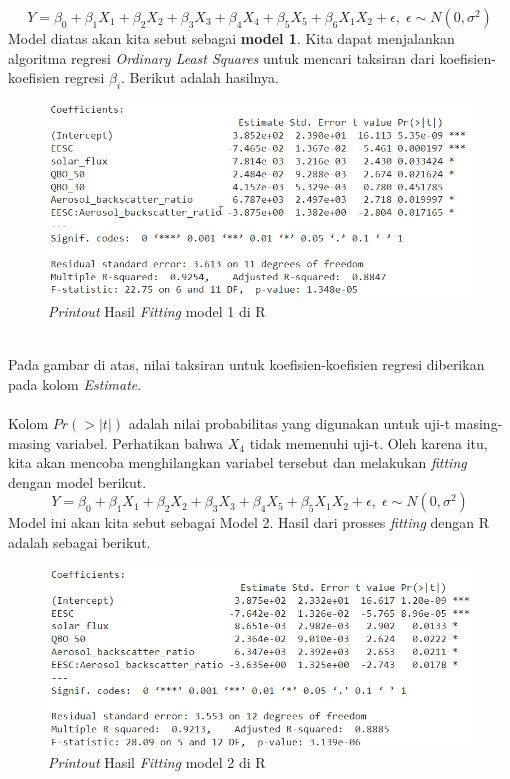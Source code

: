 \begin{enumerate}
\begin{equation*}
    Y = \beta_0 + \beta_1X_1 + \beta_2X_2 + \beta_3X_3 + \beta_4X_4 + \beta_5X_5 + \beta_6X_1X_2 +\epsilon,\;\epsilon \sim N(0, \sigma^2)
\end{equation*}
Model diatas akan kita sebut sebagai \textbf{model 1}. Kita dapat menjalankan algoritma regresi \textit{Ordinary Least Squares} untuk mencari taksiran dari koefisien-koefisien regresi $\beta_i$. Berikut adalah hasilnya.
\begin{figure}[h!]
    \centering
    \includegraphics[scale=0.7]{src/Pics/firstfitting.png}
    \caption{\textit{Printout} Hasil \textit{Fitting} model 1 di R}
    \label{fig:my_label}
\end{figure}\\
Pada gambar di atas, nilai taksiran untuk koefisien-koefisien regresi diberikan pada kolom \textit{Estimate}.
\\~\\
Kolom $Pr(>|t|)$ adalah nilai probabilitas yang digunakan untuk uji-t masing-masing variabel. Perhatikan bahwa $X_4$ tidak memenuhi uji-t. Oleh karena itu, kita akan mencoba menghilangkan variabel tersebut dan melakukan \textit{fitting} dengan model berikut.
\begin{equation*}
    Y = \beta_0 + \beta_1X_1 + \beta_2X_2 + \beta_3X_3 + \beta_4X_5 + \beta_5X_1X_2 +\epsilon,\;\epsilon \sim N(0, \sigma^2)
\end{equation*}
Model ini akan kita sebut sebagai Model 2. Hasil dari prosses \textit{fitting} dengan R adalah sebagai berikut.
\begin{figure}[h!]
    \centering
    \includegraphics[scale=0.7]{src/Pics/secondfitting.png}
    \caption{\textit{Printout} Hasil \textit{Fitting} model 2 di R}
    \label{fig:model2}
\end{figure}\\

\end{enumerate}

